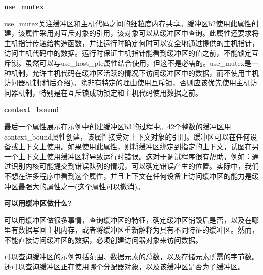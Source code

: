 \hspace*{\fill} \par %
\textbf{use\_mutex}

use\_mutex关注缓冲区和主机代码之间的细粒度内存共享。缓冲区b2使用此属性创建，该属性采用对互斥对象的引用，该对象可以从缓冲区中查询。此属性还要求将主机指针传递给构造函数，并让运行时确定何时可以安全地通过提供的主机指针，访问主机代码中的数据。运行时保证主机指针能看到缓冲区的值之前，不能锁定互斥锁。虽然可以与use\_host\_ptr属性结合使用，但这不是必需的。use\_mutex是一种机制，允许主机代码在缓冲区活跃的情况下访问缓冲区中的数据，而不使用主机访问器机制(稍后介绍)。除非有特定的理由使用互斥锁，否则应该优先使用主机访问器机制，特别是在互斥锁成功锁定和主机代码使用数据之前。\par

\hspace*{\fill} \par %
\textbf{context\_bound}

最后一个属性展示在示例中创建缓冲区b3的过程中。42个整数的缓冲区用context\_bound属性创建，该属性接受对上下文对象的引用。缓冲区可以在任何设备或上下文上使用。如果使用此属性，则将缓冲区绑定到指定的上下文，试图在另一个上下文上使用缓冲区将导致运行时错误。这对于调试程序很有帮助，例如：通过识别内核可能提交到错误队列的情况，可以确定错误产生的位置。实际中，我们不想在许多程序中看到这个属性，并且上下文在任何设备上访问缓冲区的能力是缓冲区最强大的属性之一(这个属性可以撤消)。\par

\hspace*{\fill} \par %
\textbf{可以用缓冲区做什么?}

可以用缓冲区做很多事情，查询缓冲区的特征，确定缓冲区销毁后是否，以及在哪里有数据写回主机内存，或者将缓冲区重新解释为具有不同特征的缓冲区。然而，不能直接访问缓冲区的数据，必须创建访问器对象来访问数据。\par

可以查询缓冲区的示例包括范围、数据元素的总数，以及存储元素所需的字节数。还可以查询缓冲区正在使用哪个分配器对象，以及该缓冲区是否为子缓冲区。\par

